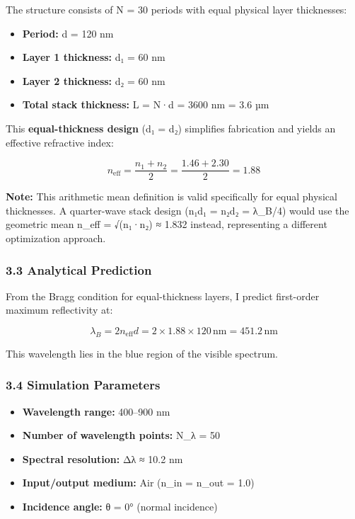 \documentclass[
]{article}
\providecommand{\tightlist}{%
  \setlength{\itemsep}{0pt}\setlength{\parskip}{0pt}}
\begin{document}
The structure consists of N = 30 periods with equal physical layer
thicknesses:

\begin{itemize}
\tightlist
\item
  \textbf{Period:} d = 120 nm
\item
  \textbf{Layer 1 thickness:} d₁ = 60 nm
\item
  \textbf{Layer 2 thickness:} d₂ = 60 nm
\item
  \textbf{Total stack thickness:} L = N·d = 3600 nm = 3.6 µm
\end{itemize}

This \textbf{equal-thickness design} (d₁ = d₂) simplifies fabrication
and yields an effective refractive index:

\[n_{\text{eff}} = \frac{n_1 + n_2}{2} = \frac{1.46 + 2.30}{2} = 1.88\]

\textbf{Note:} This arithmetic mean definition is valid specifically for
equal physical thicknesses. A quarter-wave stack design (n₁d₁ = n₂d₂ =
λ\_B/4) would use the geometric mean n\_eff = √(n₁·n₂) ≈ 1.832 instead,
representing a different optimization approach.

\subsubsection{3.3 Analytical Prediction}\label{analytical-prediction}

From the Bragg condition for equal-thickness layers, I predict
first-order maximum reflectivity at:

\[\lambda_B = 2n_{\text{eff}}d = 2 \times 1.88 \times 120\,\text{nm} = 451.2\,\text{nm}\]

This wavelength lies in the blue region of the visible spectrum.

\subsubsection{3.4 Simulation Parameters}\label{simulation-parameters}

\begin{itemize}
\tightlist
\item
  \textbf{Wavelength range:} 400--900 nm
\item
  \textbf{Number of wavelength points:} N\_λ = 50
\item
  \textbf{Spectral resolution:} Δλ ≈ 10.2 nm
\item
  \textbf{Input/output medium:} Air (n\_in = n\_out = 1.0)
\item
  \textbf{Incidence angle:} θ = 0° (normal incidence)
\end{itemize}
\end{document}
